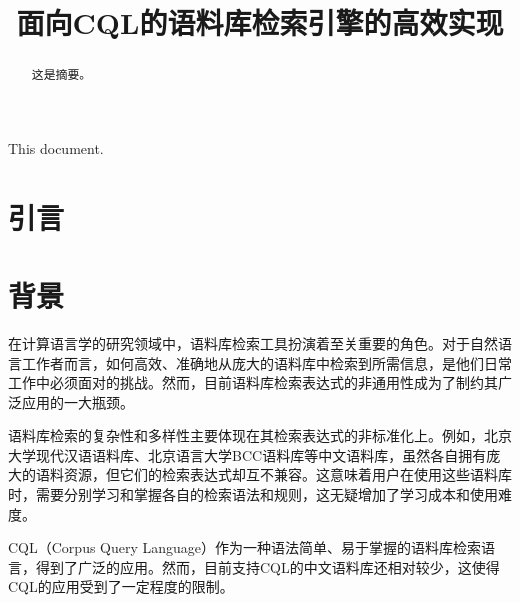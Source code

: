 \documentclass[11pt]{article}
\title{面向CQL的语料库检索引擎的高效实现}
\date{}
\begin{document}
\begin{CJK*}{UTF8}{gbsn}
\setlength{\parindent}{2em}

\maketitle
\begin{abstract}
  这是摘要。
\end{abstract}

\makeenglishtitle
\begin{englishabstract}
  This document.
  
\end{englishabstract}


\section{引言}
\label{intro}

%
%

\section{背景}
\label{backgound}

在计算语言学的研究领域中，语料库检索工具扮演着至关重要的角色。对于自然语言工作者而言，如何高效、准确地从庞大的语料库中检索到所需信息，是他们日常工作中必须面对的挑战。然而，目前语料库检索表达式的非通用性成为了制约其广泛应用的一大瓶颈。

语料库检索的复杂性和多样性主要体现在其检索表达式的非标准化上。例如，北京大学现代汉语语料库、北京语言大学BCC语料库等中文语料库，虽然各自拥有庞大的语料资源，但它们的检索表达式却互不兼容。这意味着用户在使用这些语料库时，需要分别学习和掌握各自的检索语法和规则，这无疑增加了学习成本和使用难度。

CQL（Corpus Query Language）作为一种语法简单、易于掌握的语料库检索语言，得到了广泛的应用。然而，目前支持CQL的中文语料库还相对较少，这使得CQL的应用受到了一定程度的限制。


\end{CJK*}
\end{document}
